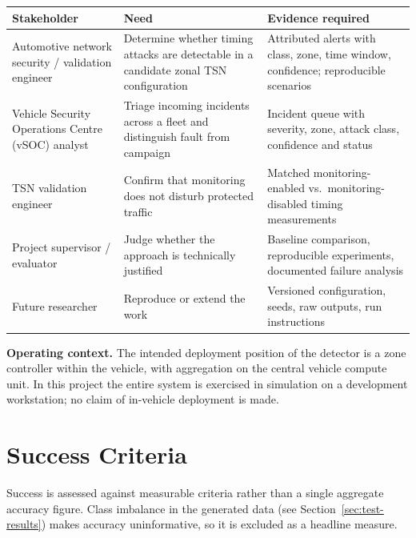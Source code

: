 \begin{longtable}{p{} p{} p{}}
\toprule
\textbf{Stakeholder} & \textbf{Need} & \textbf{Evidence required} \\
\midrule
\endhead
Automotive network security / validation engineer &
Determine whether timing attacks are detectable in a candidate zonal TSN
configuration &
Attributed alerts with class, zone, time window, confidence; reproducible scenarios \\
\addlinespace
Vehicle Security Operations Centre (vSOC) analyst &
Triage incoming incidents across a fleet and distinguish fault from campaign &
Incident queue with severity, zone, attack class, confidence and status \\
\addlinespace
TSN validation engineer &
Confirm that monitoring does not disturb protected traffic &
Matched monitoring-enabled vs.\ monitoring-disabled timing measurements \\
\addlinespace
Project supervisor / evaluator &
Judge whether the approach is technically justified &
Baseline comparison, reproducible experiments, documented failure analysis \\
\addlinespace
Future researcher &
Reproduce or extend the work &
Versioned configuration, seeds, raw outputs, run instructions \\
\bottomrule
\end{longtable}

\textbf{Operating context.} The intended deployment position of the detector is a
zone controller within the vehicle, with aggregation on the central vehicle compute
unit. In this project the entire system is exercised in simulation on a development
workstation; no claim of in-vehicle deployment is made.

\section{Success Criteria}
\label{sec:success-criteria}

Success is assessed against measurable criteria rather than a single aggregate
accuracy figure. Class imbalance in the generated data (see Section~\ref{sec:test-results}) makes
accuracy uninformative, so it is excluded as a headline measure.

